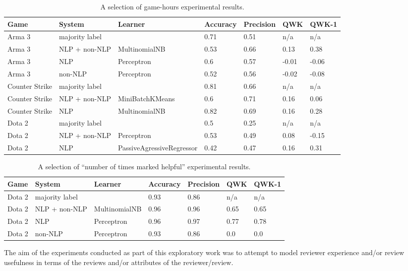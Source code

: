 \documentclass[9pt]{article}
\begin{document}
\begin{table*}[htbp]
\label{tab:gamehours}
\centering
\begin{tabular}{*{7}{l}}
\hline \bf Game & \bf System & \bf Learner & \bf Accuracy & \bf Precision & \bf QWK & \bf QWK-1 \\ \hline
Arma 3 & majority label &  & 0.71 & 0.51 & n/a & n/a \\
Arma 3 & NLP + non-NLP & MultinomialNB & 0.53 & 0.66 & 0.13 & 0.38 \\
Arma 3 & NLP & Perceptron & 0.6 & 0.57 & -0.01 & -0.06 \\
Arma 3 & non-NLP & Perceptron & 0.52 & 0.56 & -0.02 & -0.08 \\
Counter Strike & majority label &  & 0.81 & 0.66 & n/a & n/a \\
Counter Strike & NLP + non-NLP & MiniBatchKMeans & 0.6 & 0.71 & 0.16 & 0.06 \\
Counter Strike & NLP & MultinomialNB & 0.82 & 0.69 & 0.16 & 0.28 \\
Dota 2 & majority label &  & 0.5 & 0.25 & n/a & n/a \\
Dota 2 & NLP + non-NLP & Perceptron & 0.53 & 0.49 & 0.08 & -0.15 \\
Dota 2 & NLP & PassiveAgressiveRegressor & 0.42 & 0.47 & 0.16 & 0.31 \\ \hline
\end{tabular}
\caption{A selection of game-hours experimental results.}
\end{table*}

\begin{table*}[htbp]
\label{tab:hours_experiment_results}
\centering
\begin{tabular}{*{7}{l}}
\hline \bf Game & \bf System & \bf Learner & \bf Accuracy & \bf Precision & \bf QWK & \bf QWK-1 \\ \hline
Dota 2 & majority label &  & 0.93 & 0.86 & n/a & n/a \\
Dota 2 & NLP + non-NLP & MultinomialNB & 0.96 & 0.96 & 0.65 & 0.65 \\
Dota 2 & NLP & Perceptron & 0.96 & 0.97 & 0.77 & 0.78 \\
Dota 2 & non-NLP & Perceptron & 0.93 & 0.86 & 0.0 & 0.0 \\ \hline
\end{tabular}
\caption{A selection of ``number of times marked helpful'' experimental results.}
\end{table*}

The aim of the experiments conducted as part of this exploratory work was to attempt to model reviewer experience and/or review usefulness in terms of the reviews and/or attributes of the reviewer/review.
\end{document}
